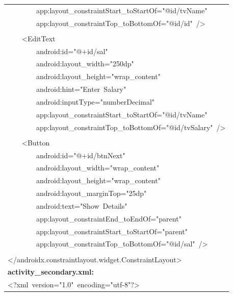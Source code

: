 \documentclass[a4paper,12pt]{article}
\begin{document}
\begin{longtable}{|p{}|}
{\ttfamily\small \ \ \ \ \ \ \ \ app:layout\_constraintStart\_toStartOf="@id/tvName"} \\
{\ttfamily\small \ \ \ \ \ \ \ \ app:layout\_constraintTop\_toBottomOf="@id/id"\ /\textgreater{}} \\
\strut \\
{\ttfamily\small \ \ \ \ \textless{}EditText} \\
{\ttfamily\small \ \ \ \ \ \ \ \ android:id="@+id/sal"} \\
{\ttfamily\small \ \ \ \ \ \ \ \ android:layout\_width="250dp"} \\
{\ttfamily\small \ \ \ \ \ \ \ \ android:layout\_height="wrap\_content"} \\
{\ttfamily\small \ \ \ \ \ \ \ \ android:hint="Enter\ Salary"} \\
{\ttfamily\small \ \ \ \ \ \ \ \ android:inputType="numberDecimal"} \\
{\ttfamily\small \ \ \ \ \ \ \ \ app:layout\_constraintStart\_toStartOf="@id/tvName"} \\
{\ttfamily\small \ \ \ \ \ \ \ \ app:layout\_constraintTop\_toBottomOf="@id/tvSalary"\ /\textgreater{}} \\
\strut \\
{\ttfamily\small \ \ \ \ \textless{}Button} \\
{\ttfamily\small \ \ \ \ \ \ \ \ android:id="@+id/btnNext"} \\
{\ttfamily\small \ \ \ \ \ \ \ \ android:layout\_width="wrap\_content"} \\
{\ttfamily\small \ \ \ \ \ \ \ \ android:layout\_height="wrap\_content"} \\
{\ttfamily\small \ \ \ \ \ \ \ \ android:layout\_marginTop="25dp"} \\
{\ttfamily\small \ \ \ \ \ \ \ \ android:text="Show\ Details"} \\
{\ttfamily\small \ \ \ \ \ \ \ \ app:layout\_constraintEnd\_toEndOf="parent"} \\
{\ttfamily\small \ \ \ \ \ \ \ \ app:layout\_constraintStart\_toStartOf="parent"} \\
{\ttfamily\small \ \ \ \ \ \ \ \ app:layout\_constraintTop\_toBottomOf="@id/sal"\ /\textgreater{}} \\
\strut \\
{\ttfamily\small \textless{}/androidx.constraintlayout.widget.ConstraintLayout\textgreater{}} \\
\hline
\rule{0pt}{13pt}\textbf{activity\_secondary.xml:} \\
\hline
{\ttfamily\small \textless{}?xml\ version="1.0"\ encoding="utf-8"?\textgreater{}} \\

\end{longtable}
\end{document}
